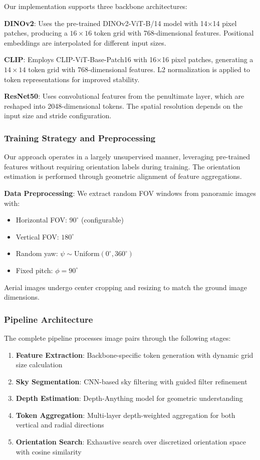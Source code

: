 Our implementation supports three backbone architectures:

\textbf{DINOv2}: Uses the pre-trained DINOv2-ViT-B/14 model with 14×14 pixel patches, producing a $16 \times 16$ token grid with 768-dimensional features. Positional embeddings are interpolated for different input sizes.

\textbf{CLIP}: Employs CLIP-ViT-Base-Patch16 with 16×16 pixel patches, generating a $14 \times 14$ token grid with 768-dimensional features. L2 normalization is applied to token representations for improved stability.

\textbf{ResNet50}: Uses convolutional features from the penultimate layer, which are reshaped into 2048-dimensional tokens. The spatial resolution depends on the input size and stride configuration.

\subsubsection{Training Strategy and Preprocessing}

Our approach operates in a largely unsupervised manner, leveraging pre-trained features without requiring orientation labels during training. The orientation estimation is performed through geometric alignment of feature aggregations.

\textbf{Data Preprocessing}: We extract random FOV windows from panoramic images with:
\begin{itemize}
    \item Horizontal FOV: $90^\circ$ (configurable)
    \item Vertical FOV: $180^\circ$ 
    \item Random yaw: $\psi \sim \text{Uniform}(0^\circ, 360^\circ)$
    \item Fixed pitch: $\phi = 90^\circ$
\end{itemize}

Aerial images undergo center cropping and resizing to match the ground image dimensions.

\subsubsection{Pipeline Architecture}

The complete pipeline processes image pairs through the following stages:
\begin{enumerate}
    \item \textbf{Feature Extraction}: Backbone-specific token generation with dynamic grid size calculation
    \item \textbf{Sky Segmentation}: CNN-based sky filtering with guided filter refinement
    \item \textbf{Depth Estimation}: Depth-Anything model for geometric understanding
    \item \textbf{Token Aggregation}: Multi-layer depth-weighted aggregation for both vertical and radial directions
    \item \textbf{Orientation Search}: Exhaustive search over discretized orientation space with cosine similarity
\end{enumerate}

